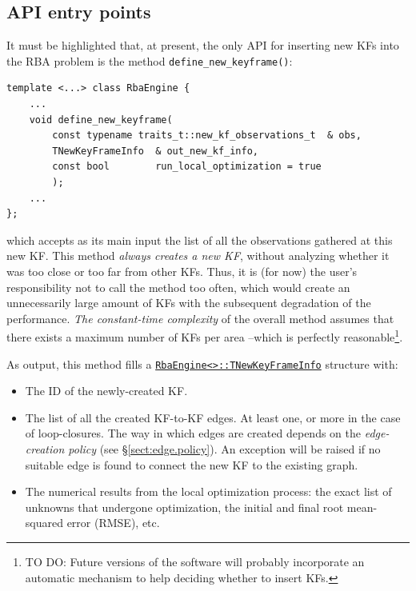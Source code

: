 \documentclass[a4paper,11pt]{article}
\begin{document}
\newpage

\subsection{API entry points}

It must be highlighted that, at present, the only API for inserting new KFs 
into the RBA problem is the method \texttt{define\_new\_keyframe()}:

\begin{lstlisting}
template <...> class RbaEngine {
    ...
	void define_new_keyframe(
		const typename traits_t::new_kf_observations_t  & obs,
		TNewKeyFrameInfo  & out_new_kf_info,
		const bool        run_local_optimization = true
		);
    ...
};
\end{lstlisting}

\noindent which accepts as its main input the list of all the observations gathered at this 
new KF. This method \emph{always creates a new KF}, without analyzing whether it was 
too close or too far from other KFs. Thus, it is (for now) the user's responsibility 
not to call the method too often, which would create an unnecessarily large amount of KFs with 
the subsequent degradation of the performance. \emph{The constant-time complexity} of the overall 
method assumes that there exists a maximum number of KFs per area --which is perfectly reasonable\footnote{TO DO: Future
versions of the software will probably incorporate an automatic mechanism to help deciding whether to insert
KFs.}.

As output, this method fills a 
\href{http://reference.mrpt.org/svn/structmrpt_1_1srba_1_1_rba_engine_1_1_t_new_key_frame_info.html}
{\texttt{RbaEngine<>::TNewKeyFrameInfo}} 
structure with:
\begin{itemize}
 \item The ID of the newly-created KF. 
 \item{ The list of all the created KF-to-KF edges. At least one, or more in the case of loop-closures. 
        The way in which edges are created depends on the \emph{edge-creation policy} (see \S\ref{sect:edge.policy}).
        An exception will be raised if no suitable edge is found to connect the new KF to the existing graph.}
 \item The numerical results from the local optimization process: the exact list of unknowns that undergone optimization, 
       the initial and final root mean-squared error (RMSE), etc.
\end{itemize}
\end{document}
